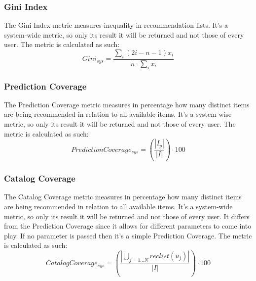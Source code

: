\documentclass[11pt]{article}
\begin{document}

\subsubsection{Gini Index}\label{subsubsec:gini}
The Gini Index metric measures inequality in recommendation lists.
It's a system-wide metric, so only its result it will be returned and not those of every user.
The metric is calculated as such:
\hfill\break
\hfill\break
    \[
        Gini_{sys} = \frac{\sum_i(2i - n - 1)x_i}{n\cdot\sum_i x_i}
    \]
\hfill\break


\subsubsection{Prediction Coverage}\label{subsubsec:pred_cov}
The Prediction Coverage metric measures in percentage how many distinct items are being recommended in relation
to all available items.
It's a system wise metric, so only its result it will be returned and not those of every user.
The metric is calculated as such:
\hfill\break
\hfill\break
    \[
         Prediction Coverage_{sys} = (\frac{|I_p|}{|I|})\cdot100
    \]
\hfill\break


\subsubsection{Catalog Coverage}\label{subsubsec:cat_cov}
The Catalog Coverage metric measures in percentage how many distinct items are being recommended in relation
to all available items.
It's a system-wide metric, so only its result it will be returned and not those of every user.
It differs from the Prediction Coverage since it allows for different parameters to come into play.
If no parameter is passed then it's a simple Prediction Coverage.
The metric is calculated as such:
\hfill\break
\hfill\break
    \[
         Catalog Coverage_{sys} = (\frac{|\bigcup_{j=1...N}reclist(u_j)|}{|I|})\cdot100
    \]
\hfill\break


\end{document}
